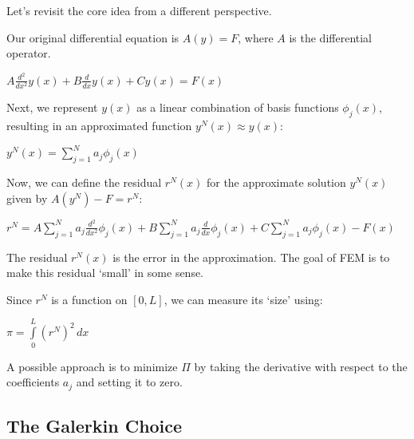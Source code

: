 \documentclass[
  11pt,
  a4paper,
]{scrbook}
\begin{document}
Let's revisit the core idea from a different perspective.

Our original differential equation is \(A(y) = F\), where \(A\) is the
differential operator.

$\displaystyle A \frac{d^{2}}{d x^{2}} y{\left(x \right)} + B \frac{d}{d x} y{\left(x \right)} + C y{\left(x \right)} = F{\left(x \right)}$

Next, we represent \(y(x)\) as a linear combination of basis functions
\(\phi_j(x)\), resulting in an approximated function
\(y^N(x) \approx y(x)\):

$\displaystyle y^{N}{\left(x \right)} = \sum_{j=1}^{N} {a}_{j} \phi_{j}(x)$

Now, we can define the residual \(r^N(x)\) for the approximate solution
\(y^N(x)\) given by \(A(y^N)-F=r^N\):

$\displaystyle r^{N} = A \sum_{j=1}^{N} {a}_{j} \frac{d^{2}}{d x^{2}} \phi_{j}(x) + B \sum_{j=1}^{N} {a}_{j} \frac{d}{d x} \phi_{j}(x) + C \sum_{j=1}^{N} {a}_{j} \phi_{j}(x) - F{\left(x \right)}$

The residual \(r^N(x)\) is the error in the approximation. The goal of
FEM is to make this residual `small' in some sense.

Since \(r^N\) is a function on \([0,L]\), we can measure its `size'
using:

$\displaystyle \pi = \int\limits_{0}^{L} \left(r^{N}\right)^{2}\, dx$

A possible approach is to minimize \(\Pi\) by taking the derivative with
respect to the coefficients \(a_j\) and setting it to zero.

\subsection{The Galerkin Choice}\label{the-galerkin-choice}
\end{document}
